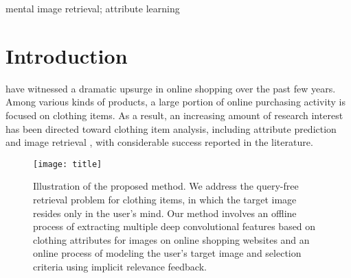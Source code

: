 \documentclass[journal]{IEEEtran}
\begin{document}
\begin{IEEEkeywords}
mental image retrieval; attribute learning
\end{IEEEkeywords}


\IEEEpeerreviewmaketitle



\section{Introduction}\label{sec::intro}


 have witnessed a dramatic upsurge in online shopping over the past few years. Among various kinds of products, a large portion of online purchasing activity is focused on clothing items. As a result, an increasing amount of research interest has been directed toward clothing item analysis, including attribute prediction \cite{abdulnabi2015multi,chen2015deep} and image retrieval \cite{yamaguchi2013paper}, with considerable success reported in the literature. %

\begin{figure}[!t]
\centering
\texttt{[image: title]}
\caption{Illustration of the proposed method. We address the query-free retrieval problem for clothing items, in which the target image resides only in the user's mind. Our method involves an offline process of extracting multiple deep convolutional features based on clothing attributes for images on online shopping websites and an online process of modeling the user's target image and selection criteria using implicit relevance feedback.}
\label{fig::title}
\end{figure}

\end{document}
